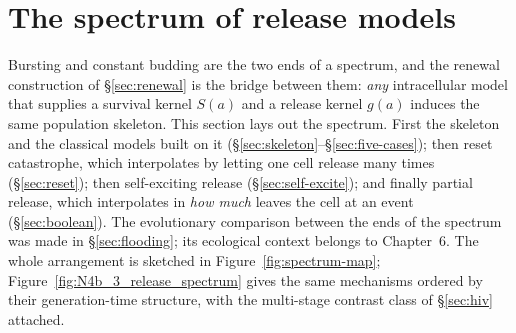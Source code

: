 
\section{The spectrum of release models}
\label{sec:spectrum}

Bursting and constant budding are the two ends of a spectrum, and the
renewal construction of \S\ref{sec:renewal} is the bridge between them:
\emph{any} intracellular model that supplies a survival kernel $S(a)$ and a
release kernel $g(a)$ induces the same population skeleton. This section
lays out the spectrum. First the skeleton and the classical models built on
it (\S\ref{sec:skeleton}--\S\ref{sec:five-cases}); then reset catastrophe,
which interpolates by letting one cell release many times
(\S\ref{sec:reset}); then self-exciting release (\S\ref{sec:self-excite});
and finally partial release, which interpolates in \emph{how much} leaves
the cell at an event (\S\ref{sec:boolean}). The evolutionary comparison
between the ends of the spectrum was made in \S\ref{sec:flooding}; its
ecological context belongs to Chapter~6. The whole arrangement is sketched
in Figure~\ref{fig:spectrum-map};
Figure~\ref{fig:N4b_3_release_spectrum} gives the same mechanisms ordered
by their generation-time structure, with the multi-stage contrast class of
\S\ref{sec:hiv} attached.

